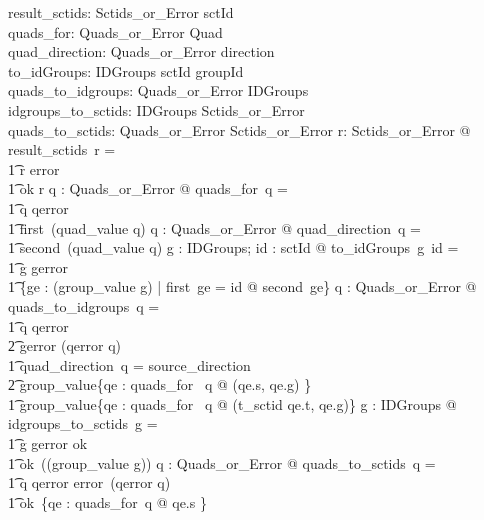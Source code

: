\documentclass{article}
\begin{document}
\begin{gendef}
   result\_sctids: Sctids\_or\_Error \fun \power sctId \\
   quads\_for: Quads\_or\_Error \fun \power Quad  \\
   quad\_direction: Quads\_or\_Error \pfun direction \\
   to\_idGroups: IDGroups \fun sctId \fun \power groupId \\
   quads\_to\_idgroups: Quads\_or\_Error \fun IDGroups \\
   idgroups\_to\_sctids: IDGroups \fun Sctids\_or\_Error \\
   quads\_to\_sctids: Quads\_or\_Error \fun Sctids\_or\_Error
\where
   \forall r: Sctids\_or\_Error @ result\_sctids~r = \\
\t1 \IF r \in \ran error \THEN \emptyset \\
\t1 \ELSE ok \inv r
\also
   \forall q : Quads\_or\_Error @ quads\_for~q = \\
\t1 \IF q \in \ran qerror  \THEN \emptyset \\
\t1 \ELSE first~(quad\_value \inv q)
\also
   \forall q : Quads\_or\_Error @ quad\_direction~q = \\
\t1 second~(quad\_value \inv q)
\also
   \forall g : IDGroups; id : sctId @ to\_idGroups~g~id = \\
\t1 \IF g \in \ran gerror \THEN \emptyset \\
\t1 \ELSE \{ge : (group\_value \inv g) | first~ge = id @ second~ge\}
\also
   \forall q : Quads\_or\_Error @ quads\_to\_idgroups~q = \\
\t1 \IF q \in \ran qerror \\
\t2     \THEN gerror (qerror \inv q) \\
\t1 \ELSE \IF quad\_direction~q = source\_direction \\
\t2     \THEN group\_value\{qe : quads\_for~ q @ (qe.s, qe.g) \} \\
\t1 \ELSE group\_value\{qe : quads\_for~ q @ (t\_sctid \inv qe.t, qe.g)\}
\also
   \forall g : IDGroups @ idgroups\_to\_sctids~g = \\
\t1 \IF g \in \ran gerror \THEN ok~\emptyset \\
\t1 \ELSE ok~(\dom (group\_value \inv g))
\also
   \forall q : Quads\_or\_Error @ quads\_to\_sctids~q = \\
\t1 \IF q \in \ran qerror \THEN error~(qerror \inv q) \\
\t1 \ELSE ok~\{qe : quads\_for~q @ qe.s \}
\end{gendef}
\end{document}

